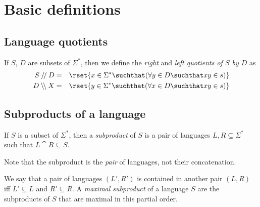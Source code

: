 \section{Basic definitions}

\newcommand{\sig}{\sigma}
\newcommand{\Sig}{\Sigma}

\newcommand{\rqq}{\mathbin{/\!/}}
\newcommand{\lqq}{\mathbin{\setminus\!\setminus}}

\subsection{Language quotients}

If $S$, $D$ are subsets of $\Sig^\ast$, then we define
the {\em right} and {\em left quotients of $S$ by $D$} as
\begin{eqnarray*}
  S \rqq D &=& 
    \rset{ x\in \Sig^\ast\suchthat (\forall y\in D\suchthat x y \in s) } \\
  D \lqq X &=& 
    \rset{ y \in \Sig^\ast\suchthat (\forall x\in D\suchthat x y \in s) }
\end{eqnarray*}

\subsection{Subproducts of a language}

If $S$ is a subset of $\Sig^\ast$, then a {\em subproduct} of $S$ is
a pair of languages $L,R\subseteq \Sig^\ast$ such that 
$L\cat R\subseteq S$.  

Note that the subproduct is the {\em pair} of languages, not their concatenation.

We say that a pair of languages $(L',R')$ is contained in another pair $(L,R)$
iff $L'\subseteq L$ and $R'\subseteq R$.  A {\em maximal subproduct}
of a language $S$ are the subproducts of $S$ that are maximal in this 
partial order.

  
    
